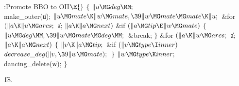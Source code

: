 \B{}:Promote BBO to OII\X${}\E{}$\6
${}\{{}$\1\6
${}\|u\MG\\{deg}\MM;{}$\6
\\{make\_outer}(\|u);\6
${}\|u\MG\\{mate}\K\|w\MG\\{mate},\39\|w\MG\\{mate}\MG\\{mate}\K\|u;{}$\6
\&{for} ${}(\|a\K\|u\MG\\{arcs};{}$ \|a; ${}\|a\K\|a\MG\\{next}){}$\1\6
\&{if} ${}(\|a\MG\\{tip}\E\|w\MG\\{mate}){}$\5
${}\{{}$\1\6
${}\|u\MG\\{deg}\MM,\39\|w\MG\\{mate}\MG\\{deg}\MM;{}$\6
\&{break};\6
\4${}\}{}$\2\2\6
\&{for} ${}(\|a\K\|w\MG\\{arcs};{}$ \|a; ${}\|a\K\|a\MG\\{next}){}$\5
${}\{{}$\1\6
${}\|v\K\|a\MG\\{tip};{}$\6
\&{if} ${}(\|v\MG\\{type}\I\\{inner}){}$\1\5
${}\\{decrease\_deg}(\|v,\39\|w\MG\\{mate});{}$\2\6
\4${}\}{}$\2\6
${}\|w\MG\\{type}\K\\{inner};{}$\6
\\{dancing\_delete}(\|w);\6
\4${}\}{}$\2\par
\U18.\fi

